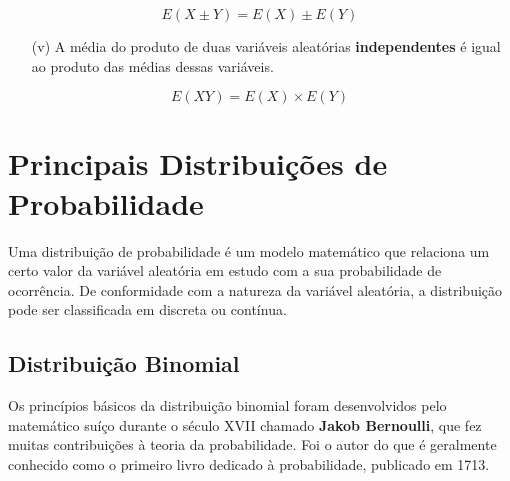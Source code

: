 \begin{equation}\label{}
E(X \pm Y)= E(X)\pm E(Y)
\end{equation}


\begin{enumerate}
    \item[{(v)}] A média do produto de duas variáveis
    aleatórias \textbf{independentes} é igual ao produto das
    médias dessas variáveis.
\end{enumerate}


\begin{equation}\label{}
E(XY)= E(X) \times E(Y)
\end{equation}





\newpage
\section{Principais Distribuições de Probabilidade}
 
 
\inic Uma distribuição de probabilidade é um modelo matemático que relaciona um certo valor da variável aleatória em estudo com a sua probabilidade de ocorrência. De conformidade com a natureza da variável aleatória, a distribuição pode ser classificada em discreta ou contínua.
 
\subsection{Distribuição Binomial}

Os princípios básicos da distribuição binomial foram desenvolvidos pelo matemático suíço durante o século XVII chamado \textbf{Jakob Bernoulli}, que fez muitas contribuições à teoria da probabilidade. Foi o autor do que é geralmente conhecido como o primeiro livro dedicado à probabilidade, publicado em 1713.

